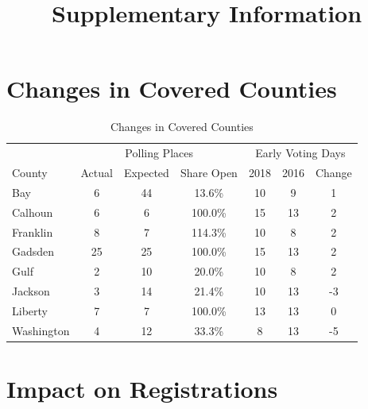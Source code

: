 \documentclass[
  12pt,
]{article}
\title{Supplementary Information}
\author{}
\date{\vspace{-2.5em}}
\begin{document}
\maketitle

{
\setcounter{tocdepth}{2}
\tableofcontents
}
\doublespacing

\hypertarget{changes-in-covered-counties}{%
\section*{Changes in Covered Counties}\label{changes-in-covered-counties}}

\begin{singlespace}
\begin{table}[!h]

\caption{\label{tab:change-tab}\label{tab:table-changes} Changes in Covered Counties}
\centering
\begin{tabular}[t]{lcccccc}
\toprule
\multicolumn{1}{c}{ } & \multicolumn{3}{c}{Polling Places} & \multicolumn{3}{c}{Early Voting Days} \\
\cmidrule(l{3pt}r{3pt}){2-4} \cmidrule(l{3pt}r{3pt}){5-7}
County & Actual & Expected & Share Open & 2018 & 2016 & Change\\
\midrule
Bay & 6 & 44 & 13.6\% & 10 & 9 & 1\\
Calhoun & 6 & 6 & 100.0\% & 15 & 13 & 2\\
Franklin & 8 & 7 & 114.3\% & 10 & 8 & 2\\
Gadsden & 25 & 25 & 100.0\% & 15 & 13 & 2\\
Gulf & 2 & 10 & 20.0\% & 10 & 8 & 2\\
Jackson & 3 & 14 & 21.4\% & 10 & 13 & -3\\
Liberty & 7 & 7 & 100.0\% & 13 & 13 & 0\\
Washington & 4 & 12 & 33.3\% & 8 & 13 & -5\\
\bottomrule
\end{tabular}
\end{table}
\end{singlespace}

\hypertarget{impact-on-registrations}{%
\section*{Impact on Registrations}\label{impact-on-registrations}}
\end{document}
